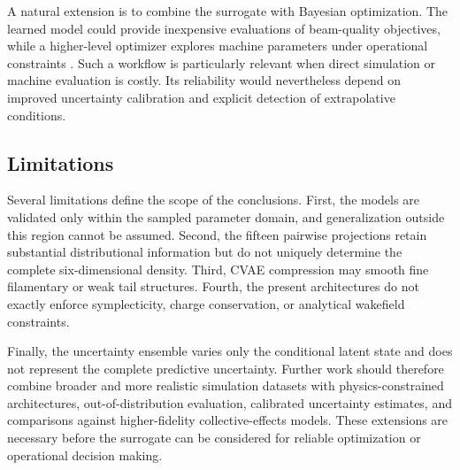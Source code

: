 A natural extension is to combine the surrogate with Bayesian optimization. The learned model could provide inexpensive evaluations of beam-quality objectives, while a higher-level optimizer explores machine parameters under operational constraints \cite{roussel_bayesian_2024}. Such a workflow is particularly relevant when direct simulation or machine evaluation is costly. Its reliability would nevertheless depend on improved uncertainty calibration and explicit detection of extrapolative conditions.

\subsection{Limitations}
\label{subsec:discussion_limitations}

Several limitations define the scope of the conclusions. First, the models are validated only within the sampled parameter domain, and generalization outside this region cannot be assumed. Second, the fifteen pairwise projections retain substantial distributional information but do not uniquely determine the complete six-dimensional density. Third, CVAE compression may smooth fine filamentary or weak tail structures. Fourth, the present architectures do not exactly enforce symplecticity, charge conservation, or analytical wakefield constraints.

Finally, the uncertainty ensemble varies only the conditional latent state and does not represent the complete predictive uncertainty. Further work should therefore combine broader and more realistic simulation datasets with physics-constrained architectures, out-of-distribution evaluation, calibrated uncertainty estimates, and comparisons against higher-fidelity collective-effects models. These extensions are necessary before the surrogate can be considered for reliable optimization or operational decision making.